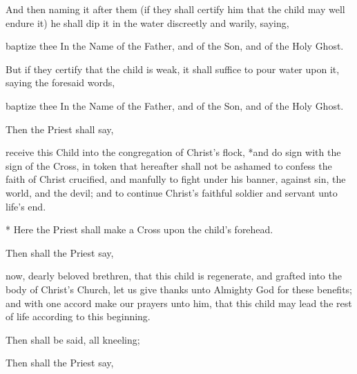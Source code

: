 \begin{rubric}
And then naming it after them (if they shall certify him that the child may well endure it) he shall dip it in the water discreetly and warily, saying,
\end{rubric}

 baptize thee In the Name of the Father, and of the Son, and of the Holy Ghost.

\begin{rubric}
But if they certify that the child is weak, it shall suffice to pour water upon it, saying the foresaid words,
\end{rubric}

 baptize thee In the Name of the Father, and of the Son, and of the Holy Ghost.

\newpage

\begin{rubric}
Then the Priest shall say,
\end{rubric}

 receive this Child into the congregation of Christ's flock, *and do sign  with the sign of the Cross, in token that hereafter  shall not be ashamed to confess the faith of Christ crucified, and manfully to fight under his banner, against sin, the world, and the devil; and to continue Christ's faithful soldier and servant unto  life's end.
\begin{secrubric}
* Here the Priest shall make a Cross upon the child's forehead.
\end{secrubric}

\begin{rubric}
Then shall the Priest say,
\end{rubric}

 now, dearly beloved brethren, that this child is regenerate, and grafted into the body of Christ's Church, let us give thanks unto Almighty God for these benefits; and with one accord make our prayers unto him, that this child may lead the rest of  life according to this beginning.

\begin{rubric}
Then shall be said, all kneeling;
\end{rubric}



\begin{rubric}
Then shall the Priest say,
\end{rubric}

